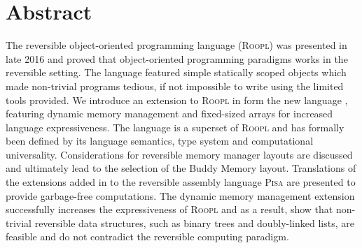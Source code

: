 \chapter*{Abstract}

The reversible object-oriented programming language (\textsc{Roopl}) was presented in late 2016 and proved that object-oriented programming paradigms works in the reversible setting. The language featured simple statically scoped objects which made non-trivial programs tedious, if not impossible to write using the limited tools provided.
We introduce an extension to \textsc{Roopl} in form the new language \rooplpp, featuring dynamic memory management and fixed-sized arrays for increased language expressiveness. The language is a superset of \textsc{Roopl} and has formally been defined by its language semantics, type system and computational universality. Considerations for reversible memory manager layouts are discussed and ultimately lead to the selection of the Buddy Memory layout. Translations of the extensions added in \rooplpp to the reversible assembly language \textsc{Pisa} are presented to provide garbage-free computations. The dynamic memory management extension successfully increases the expressiveness of \textsc{Roopl} and as a result, show that non-trivial reversible data structures, such as binary trees and doubly-linked lists, are feasible and do not contradict the reversible computing paradigm.